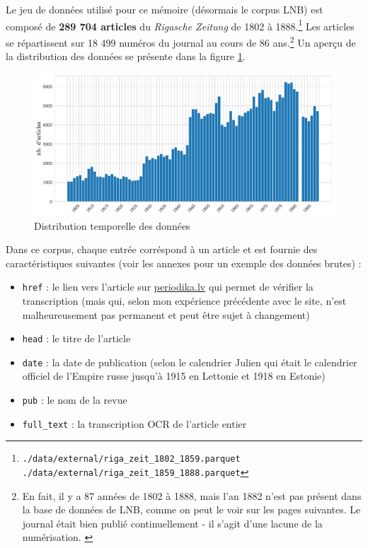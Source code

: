\documentclass[a4paper,twoside,12pt]{article}
\begin{document}
Le jeu de données utilisé pour ce mémoire (désormais le corpus LNB) est composé de \textbf{289 704 articles} du \textit{Rigasche Zeitung} de 1802 à 1888.\footnote{\texttt{./data/external/riga\_zeit\_1802\_1859.parquet \newline ./data/external/riga\_zeit\_1859\_1888.parquet}} Les articles se répartissent sur 18 499 numéros du journal au cours de 86 ans.\footnote{En fait, il y a 87 années de 1802 à 1888, mais l'an 1882 n'est pas présent dans la base de données de LNB, comme on peut le voir sur les pages suivantes. Le journal était bien publié continuellement - il s'agit d'une lacune de la numérisation. \label{86_years}} Un aperçu de la distribution des données se présente dans la figure \ref{fig:data_hist}.

\begin{figure}[t]
    \centering
    \includegraphics[width=\textwidth]{images/articles_histogram.pdf}
    \caption{Distribution temporelle des données}
    \label{fig:data_hist}
\end{figure}

Dans ce corpus, chaque entrée corréspond à un article et est fournie des caractéristiques suivantes (voir les annexes pour un exemple des données brutes) :

\vspace{1ex}
\begin{itemize}[label=$\bullet$]
    \item \texttt{href} : le lien vers l'article sur \url{periodika.lv} qui permet de vérifier la transcription (mais qui, selon mon expérience précédente avec le site, n'est malheureusement pas permanent et peut être sujet à changement)
    \item \texttt{head} : le titre de l'article
    \item \texttt{date} : la date de publication (selon le calendrier Julien qui était le calendrier officiel de l'Empire russe jusqu'à 1915 en Lettonie et 1918 en Estonie)
    \item \texttt{pub} : le nom de la revue
    \item \texttt{full\_text} : la transcription OCR de l'article entier
    
\end{itemize}
\vspace{1ex}
\end{document}
